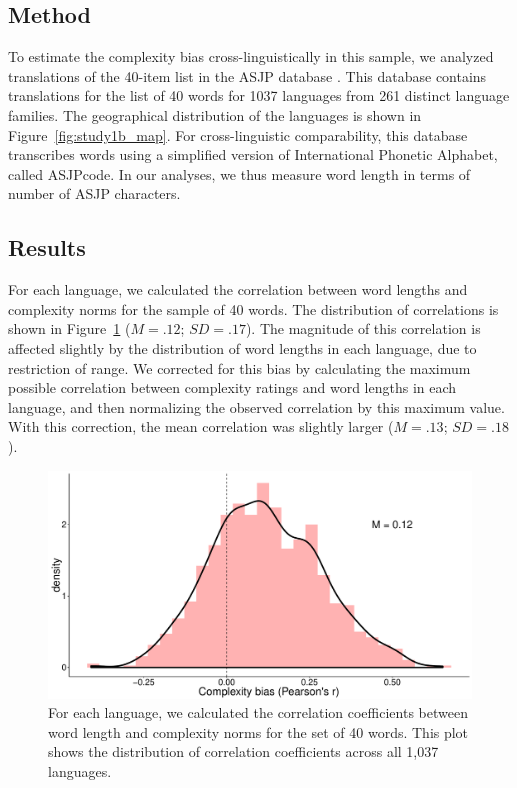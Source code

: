 \subsection{Method}
To estimate the complexity bias cross-linguistically in this sample, we analyzed translations of the 40-item list in the  ASJP database \cite{asjp}. This database contains translations for the list of 40 words for 1037 languages from 261 distinct language families. The geographical distribution of the languages is shown in Figure\ \ref{fig:study1b_map}. For cross-linguistic comparability, this database transcribes words using a simplified version of International Phonetic Alphabet, called ASJPcode. In our analyses, we thus measure word length in terms of number of ASJP characters.

\subsection{Results}
For each language, we calculated the correlation between word lengths and complexity norms for the sample of 40 words. The distribution of correlations is shown in  
Figure\ \ref{fig:study1b} ($M = .12$; $SD = .17$). The magnitude of this correlation is affected slightly by the distribution of word lengths in each language, due to restriction of range. We corrected for this bias by calculating the maximum possible correlation between complexity ratings and word lengths in each language, and then normalizing the observed correlation by this maximum value. With this correction, the mean correlation was slightly larger ($M = .13$; $SD = .18$). 

\begin{figure}[t!]
\begin{center}
\includegraphics[scale = .35]{figs/chap4_1b.pdf}
\end{center}
\caption{For each language, we calculated the correlation coefficients between word length and complexity norms for the set of 40 words. This plot shows the distribution of correlation coefficients across all 1,037 languages. }
\label{fig:study1b}
\end{figure}



